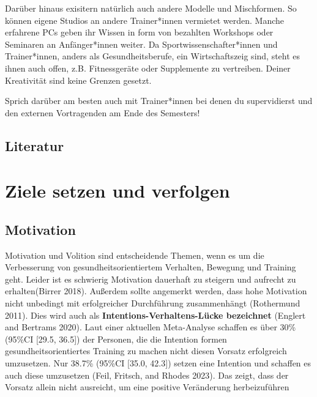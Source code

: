 \documentclass[
  letterpaper,
  DIV=11,
  numbers=noendperiod]{scrreprt}
\begin{document}
Darüber hinaus exisitern natürlich auch andere Modelle und Mischformen.
So können eigene Studios an andere Trainer*innen vermietet werden.
Manche erfahrene PCs geben ihr Wissen in form von bezahlten Workshops
oder Seminaren an Anfänger*innen weiter. Da Sportwissenschafter*innen
und Trainer*innen, anders als Gesundheitsberufe, ein Wirtschaftszeig
sind, steht es ihnen auch offen, z.B. Fitnessgeräte oder Supplemente zu
vertreiben. Deiner Kreativität sind keine Grenzen gesetzt.

\begin{tcolorbox}[enhanced jigsaw, colback=white, toptitle=1mm, opacitybacktitle=0.6, title=\textcolor{quarto-callout-tip-color}{\faLightbulb}\hspace{0.5em}{Tip}, colframe=quarto-callout-tip-color-frame, colbacktitle=quarto-callout-tip-color!10!white, toprule=.15mm, rightrule=.15mm, bottomtitle=1mm, left=2mm, arc=.35mm, opacityback=0, titlerule=0mm, coltitle=black, breakable, leftrule=.75mm, bottomrule=.15mm]

Sprich darüber am besten auch mit Trainer*innen bei denen du
supervidierst und den externen Vortragenden am Ende des Semesters!

\end{tcolorbox}

\section{Literatur}\label{literatur-4}


\chapter{Ziele setzen und verfolgen}\label{ziele-setzen-und-verfolgen}

\section{Motivation}\label{motivation}

Motivation und Volition sind entscheidende Themen, wenn es um die
Verbesserung von gesundheitsorientiertem Verhalten, Bewegung und
Training geht. Leider ist es schwierig Motivation dauerhaft zu steigern
und aufrecht zu erhalten(Birrer 2018). Außerdem sollte angemerkt werden,
dass hohe Motivation nicht unbedingt mit erfolgreicher Durchführung
zusammenhängt (Rothermund 2011). Dies wird auch als
\textbf{Intentions-Verhaltens-Lücke bezeichnet} (Englert and Bertrams
2020). Laut einer aktuellen Meta-Analyse schaffen es über 30\% (95\%CI
{[}29.5, 36.5{]}) der Personen, die die Intention formen
gesundheitsorientiertes Training zu machen nicht diesen Vorsatz
erfolgreich umzusetzen. Nur 38.7\% (95\%CI {[}35.0, 42.3{]}) setzen eine
Intention und schaffen es auch diese umzusetzen (Feil, Fritsch, and
Rhodes 2023). Das zeigt, dass der Vorsatz allein nicht ausreicht, um
eine positive Veränderung herbeizuführen
\end{document}
